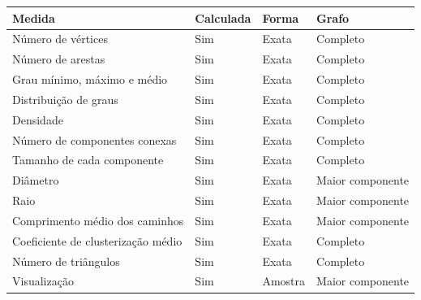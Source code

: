 \begin{tabular}{llll}
\toprule
Medida & Calculada & Forma & Grafo \\
\midrule
Número de vértices & Sim & Exata & Completo \\
Número de arestas & Sim & Exata & Completo \\
Grau mínimo, máximo e médio & Sim & Exata & Completo \\
Distribuição de graus & Sim & Exata & Completo \\
Densidade & Sim & Exata & Completo \\
Número de componentes conexas & Sim & Exata & Completo \\
Tamanho de cada componente & Sim & Exata & Completo \\
Diâmetro & Sim & Exata & Maior componente \\
Raio & Sim & Exata & Maior componente \\
Comprimento médio dos caminhos & Sim & Exata & Maior componente \\
Coeficiente de clusterização médio & Sim & Exata & Completo \\
Número de triângulos & Sim & Exata & Completo \\
Visualização & Sim & Amostra & Maior componente \\
\bottomrule
\end{tabular}
